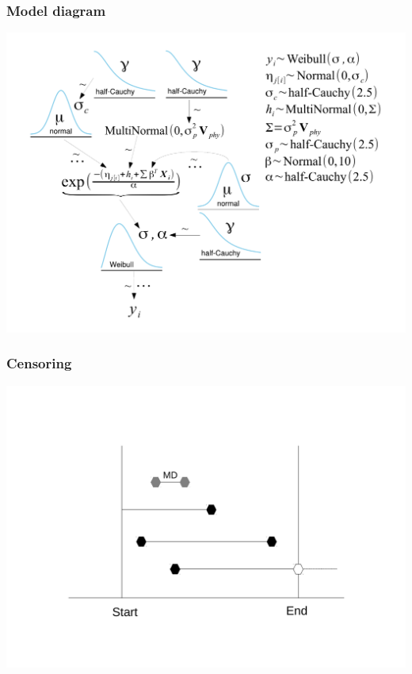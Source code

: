 \documentclass{beamer}
\begin{document}
\begin{frame}
  \frametitle{Model diagram}
  \begin{center}
    \includegraphics[height = 0.8\textheight, width = \textwidth,  keepaspectratio = true]{figure/mammal_survival_model}
  \end{center}
\end{frame}

\begin{frame}
  \frametitle{Censoring}
  \begin{center}
    \includegraphics[height = 0.8\textheight, width = \textwidth,  keepaspectratio = true]{figure/censoring_diagram}
  \end{center}
\end{frame}
\end{document}
